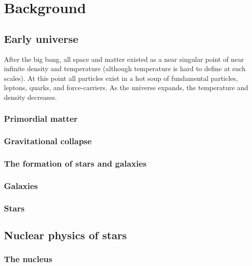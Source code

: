\section{Background}

\subsection{Early universe}
After the big bang, all space and matter existed as a near singular point of near infinite density and temperature (although temperature is hard to define at such scales).
At this point all particles exist in a hot soup of fundamental particles, leptons, quarks, and force-carriers.
As the universe expands, the temperature and density decreases.

\subsubsection{Primordial matter}
\subsubsection{Gravitational collapse}
\subsubsection{The formation of stars and galaxies}
\subsubsection{Galaxies}
\subsubsection{Stars}

\subsection{Nuclear physics of stars}
\subsubsection{The nucleus}
